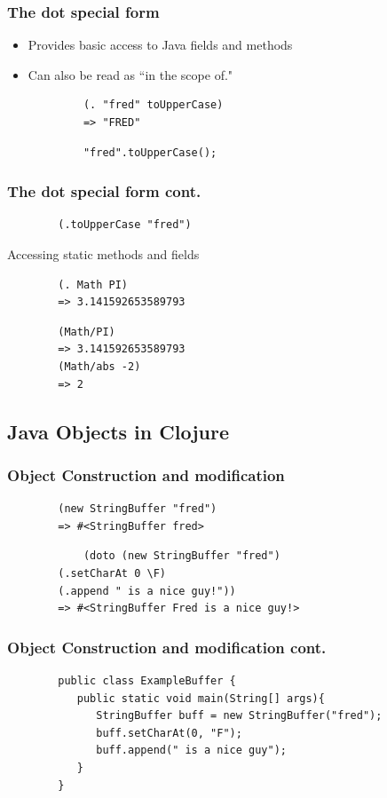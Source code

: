 \documentclass[xcolor=dvipsnames]{beamer}
\begin{document}
		\begin{frame}[fragile]
		\frametitle{The dot special form}
			\begin{itemize}
				\item Provides basic access to Java fields and methods
				\item Can also be read as ``in the scope of."
			\end{itemize}
			\begin{verbatim}
			(. "fred" toUpperCase)
			=> "FRED"
			\end{verbatim}
			\pause
			\begin{verbatim}
			"fred".toUpperCase();
			\end{verbatim}
		\end{frame}
		
		\begin{frame}[fragile]
		\frametitle{The dot special form cont.}
		\begin{verbatim}
		(.toUpperCase "fred")
		\end{verbatim}		
		\pause
		Accessing static methods and fields
		\begin{verbatim}
		(. Math PI)
		=> 3.141592653589793
		\end{verbatim}		
		\begin{verbatim}
		(Math/PI)
		=> 3.141592653589793
		(Math/abs -2)
		=> 2
		\end{verbatim}		
		\end{frame}
		
		\subsection{Java Objects in Clojure}
		\begin{frame}[fragile]
		\frametitle{Object Construction and modification}
		\begin{verbatim}
	    (new StringBuffer "fred")
	    => #<StringBuffer fred>
		\end{verbatim}
		\pause
		\begin{verbatim}
		    (doto (new StringBuffer "fred") 
	    (.setCharAt 0 \F) 
	    (.append " is a nice guy!"))
	    => #<StringBuffer Fred is a nice guy!>
	    \end{verbatim}	
		\end{frame}
		
		\begin{frame}[fragile]
		\frametitle{Object Construction and modification cont.}
		\begin{verbatim}		
		public class ExampleBuffer {
		   public static void main(String[] args){
		      StringBuffer buff = new StringBuffer("fred");
		      buff.setCharAt(0, "F");
		      buff.append(" is a nice guy");
		   }
		}
		\end{verbatim}
		\end{frame}
		
\end{document}

